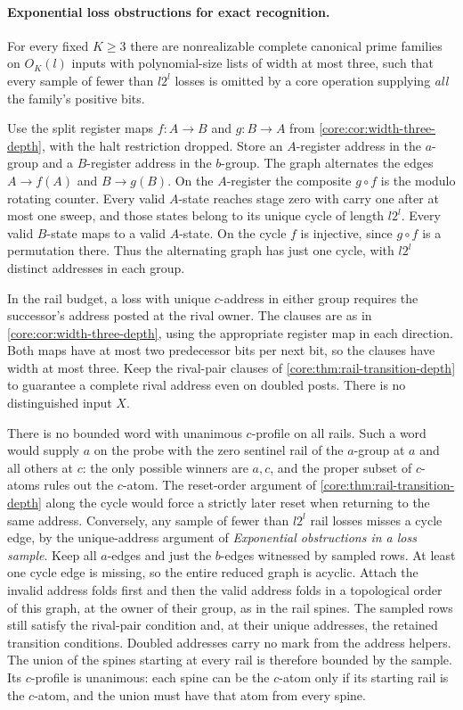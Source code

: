 \paragraph{Exponential loss obstructions for exact recognition.}
For every fixed $K\ge3$ there are nonrealizable
complete canonical prime families on $O_K(l)$
inputs with polynomial-size lists of width at
most three, such that every sample of fewer than
$l2^l$ losses is omitted by a core operation
supplying \emph{all} the family's positive bits.

Use the split register maps $f:A\to B$ and
$g:B\to A$ from \cref{core:cor:width-three-depth},
with the halt restriction dropped. Store an
$A$-register address in the $a$-group and a
$B$-register address in the $b$-group. The graph
alternates the edges $A\to f(A)$ and $B\to g(B)$.
On the $A$-register the composite $g\circ f$
is the modulo rotating counter. Every valid
$A$-state reaches stage zero with carry one
after at most one sweep, and those states
belong to its unique cycle of length $l2^l$.
Every valid $B$-state maps to a valid $A$-state.
On the cycle $f$ is injective, since $g\circ f$
is a permutation there. Thus the alternating
graph has just one cycle, with $l2^l$ distinct
addresses in each group.

In the rail budget, a loss with unique $c$-address
in either group requires the successor's address
posted at the rival owner. The clauses are as in
\cref{core:cor:width-three-depth}, using the
appropriate register map in each direction.
Both maps have at most two predecessor bits per
next bit, so the clauses have width at most
three. Keep the rival-pair clauses of
\cref{core:thm:rail-transition-depth} to guarantee
a complete rival address even on doubled posts.
There is no distinguished input $X$.

There is no bounded word with unanimous
$c$-profile on all rails. Such a word would
supply $a$ on the probe with the zero sentinel
rail of the $a$-group at $a$ and all others
at $c$: the only possible winners are $a,c$,
and the proper subset of $c$-atoms rules out
the $c$-atom. The reset-order argument of
\cref{core:thm:rail-transition-depth} along
the cycle would force a strictly later reset
when returning to the same address. Conversely,
any sample of fewer than $l2^l$ rail losses
misses a cycle edge, by the unique-address
argument of \emph{Exponential obstructions in a
loss sample}. Keep all $a$-edges and just the
$b$-edges witnessed by sampled rows. At least
one cycle edge is missing, so the entire reduced
graph is acyclic. Attach the invalid address
folds first and then the valid address folds
in a topological order of this graph, at the
owner of their group, as in the rail spines. The sampled rows
still satisfy the rival-pair condition and,
at their unique addresses, the retained
transition conditions. Doubled addresses
carry no mark from the address helpers.
The union of the spines starting at every
rail is therefore bounded by the sample.
Its $c$-profile is unanimous: each spine
can be the $c$-atom only if its starting
rail is the $c$-atom, and the union must
have that atom from every spine.

